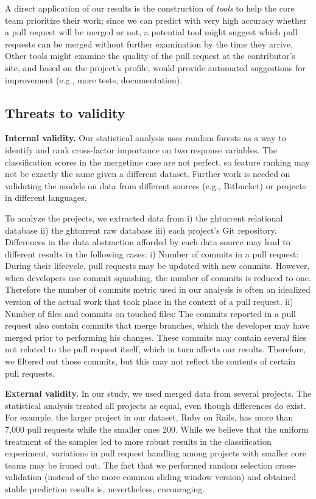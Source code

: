 \documentclass{sig-alternate}
\begin{document}

A direct application of our results is the construction of \emph{tools}
to help the core team prioritize their work; since we can predict
with very high accuracy whether a pull request will be merged or not, a
potential tool might suggest which pull requests can be merged without further
examination by the time they arrive. Other tools might examine the quality of
the pull request at the contributor's site, and based on the project's
profile, would provide automated suggestions for improvement (e.g., more tests,
documentation). 

\subsection{Threats to validity}

\textbf{Internal validity.} Our statistical analysis uses random forests as a way
to identify and rank cross-factor importance on two response variables. The classification
scores in the \textsf{mergetime} case are not perfect, so feature ranking may
not be exactly the same given a different dataset. Further work is needed on
validating the models on data from different sources (e.g., Bitbucket) or projects in different languages. 

To analyze the projects, we extracted data from i) the {\sc ght}orrent relational
database ii) the {\sc ght}orrent raw database iii) each project's Git repository.
Differences in the data abstraction afforded by each data source may
lead to different results in the following cases: 
i) Number of commits in a pull request: During their lifecycle, pull requests
may be updated with new commits. However, when developers use commit squashing,
the number of commits is reduced to one. Therefore the number of commits metric
used in our analysis is often an idealized version of the actual work
that took place in the context of a pull request.
ii) Number of files and commits on touched files: The commits reported
in a pull request also contain commits that merge branches, which the
developer may have merged prior to performing his changes. These commits
may contain several files not related to the pull request itself, which
in turn affects our results. Therefore, we  
filtered out those commits, but this may not reflect the contents of 
certain pull requests.

\textbf{External validity.} In our study, we used merged data from several
projects. The statistical analysis treated all projects as equal, even though
differences do exist.  For example, the larger project in our dataset, Ruby on
Rails, has more than 7,000 pull requests while the smaller ones 200.  While
we believe that the uniform treatment of the samples led to more robust results
in the classification experiment, variations in pull request handling among
projects with smaller core teams may be ironed out.  The fact that we performed
random selection cross-validation (instead of the more common sliding window
version) and obtained stable prediction results is, nevertheless,
encouraging.
\end{document}
